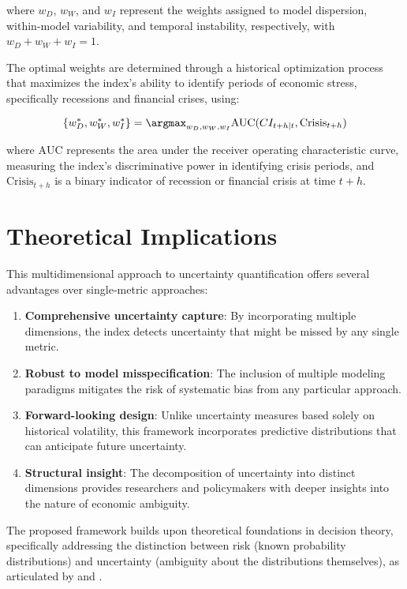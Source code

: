 \documentclass[5p,authoryear]{elsarticle}
\begin{document}
where $w_D$, $w_W$, and $w_I$ represent the weights assigned to model dispersion, within-model variability, and temporal instability, respectively, with $w_D + w_W + w_I = 1$.

The optimal weights are determined through a historical optimization process that maximizes the index's ability to identify periods of economic stress, specifically recessions and financial crises, using:

\begin{equation}
\{w_D^*, w_W^*, w_I^*\} = \argmax_{w_D, w_W, w_I} \text{AUC}(CI_{t+h|t}, \text{Crisis}_{t+h})
\end{equation}

where $\text{AUC}$ represents the area under the receiver operating characteristic curve, measuring the index's discriminative power in identifying crisis periods, and $\text{Crisis}_{t+h}$ is a binary indicator of recession or financial crisis at time $t+h$.

\section{Theoretical Implications}

This multidimensional approach to uncertainty quantification offers several advantages over single-metric approaches:

\begin{enumerate}
    \item \textbf{Comprehensive uncertainty capture}: By incorporating multiple dimensions, the index detects uncertainty that might be missed by any single metric.
    
    \item \textbf{Robust to model misspecification}: The inclusion of multiple modeling paradigms mitigates the risk of systematic bias from any particular approach.
    
    \item \textbf{Forward-looking design}: Unlike uncertainty measures based solely on historical volatility, this framework incorporates predictive distributions that can anticipate future uncertainty.
    
    \item \textbf{Structural insight}: The decomposition of uncertainty into distinct dimensions provides researchers and policymakers with deeper insights into the nature of economic ambiguity.
\end{enumerate}

The proposed framework builds upon theoretical foundations in decision theory, specifically addressing the distinction between risk (known probability distributions) and uncertainty (ambiguity about the distributions themselves), as articulated by \citet{Knight1921} and \citet{Ellsberg1961}.
\end{document}
